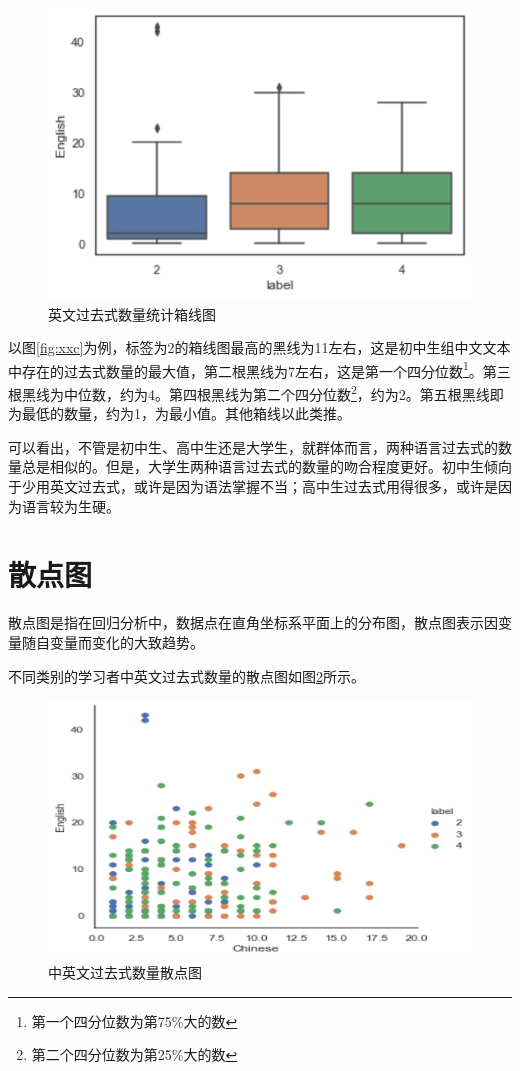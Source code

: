 \documentclass[]{article}
\begin{document}
\begin{figure}
	\centering
	\includegraphics[width=0.7\linewidth]{fig/xxe}
	\caption{英文过去式数量统计箱线图}
	\label{fig:xxe}
\end{figure}

以图\ref{fig:xxc}为例，标签为2的箱线图最高的黑线为11左右，这是初中生组中文文本中存在的过去式数量的最大值，第二根黑线为7左右，这是第一个四分位数\footnote{第一个四分位数为第75\%大的数}。第三根黑线为中位数，约为4。第四根黑线为第二个四分位数\footnote{第二个四分位数为第25\%大的数}，约为2。第五根黑线即为最低的数量，约为1，为最小值。其他箱线以此类推。

可以看出，不管是初中生、高中生还是大学生，就群体而言，两种语言过去式的数量总是相似的。但是，大学生两种语言过去式的数量的吻合程度更好。初中生倾向于少用英文过去式，或许是因为语法掌握不当；高中生过去式用得很多，或许是因为语言较为生硬。

\section{散点图}

散点图是指在回归分析中，数据点在直角坐标系平面上的分布图，散点图表示因变量随自变量而变化的大致趋势。

不同类别的学习者中英文过去式数量的散点图如图\ref{fig:sdtt}所示。

\begin{figure}
	\centering
	\includegraphics[width=0.7\linewidth]{fig/sdtt}
	\caption{中英文过去式数量散点图}
	\label{fig:sdtt}
\end{figure}
\end{document}
